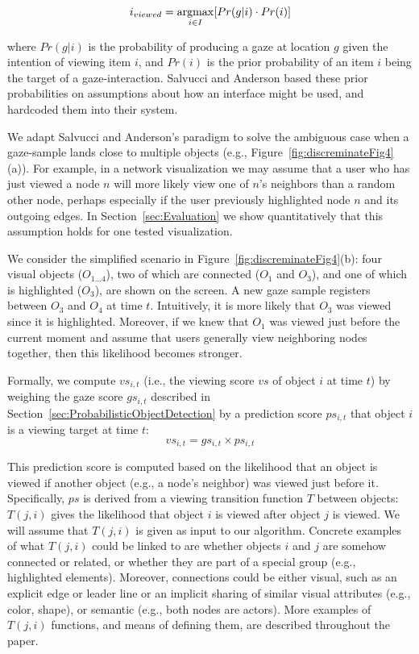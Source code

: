 \begin{equation*}
i_{viewed} = \displaystyle \operatorname*{argmax}_{i\in I}[Pr(g|i)\cdot Pr(i)]
\end{equation*}

where $Pr(g|i)$ is the probability of producing a gaze at location $g$ given the intention of viewing item $i$, and $Pr(i)$ is the prior probability of an item $i$  being the target of a gaze-interaction. Salvucci and Anderson based these prior probabilities on assumptions about how an interface might be used, and hardcoded them into their system.  

We adapt Salvucci and Anderson's paradigm to solve the ambiguous case when a gaze-sample lands close to multiple objects (e.g.,  Figure~\ref{fig:discreminateFig4}(a)). For example, in a network visualization we may assume that a user who has just viewed a node $n$ will more likely view one of $n$'s neighbors than a random other node, perhaps especially if the user previously highlighted node $n$ and its outgoing edges.  In Section~\ref{sec:Evaluation} we show quantitatively that this assumption holds for one tested visualization.  

We consider the simplified scenario in Figure~\ref{fig:discreminateFig4}(b): four visual objects ($O_{1\ldots 4}$), two of which are connected ($O_1$ and $O_3$), and one of which is highlighted ($O_3$), are shown on the screen. A new gaze sample registers between $O_3$ and $O_4$ at time $t$. Intuitively, it is more likely that $O_3$ was viewed since it is highlighted. Moreover, if we knew that $O_1$ was viewed just before the current moment  and assume that users generally view neighboring nodes together, then this likelihood becomes stronger.         
 
Formally, we compute $vs_{i,t}$  (i.e., the viewing score $vs$ of object $i$ at time $t$) by weighing the gaze score $gs_{i,t}$ described in Section~\ref{sec:ProbabilisticObjectDetection} by a prediction score $ps_{i,t}$ that object $i$ is a viewing target at time $t$:  
\begin{equation}
vs_{i,t} = gs_{i,t} \times ps_{i,t}
\label{eq:VS}
\end{equation}

This prediction score is computed based on the likelihood that an object is viewed if another object (e.g.,  a node's neighbor) was viewed just before it. Specifically, $ps$ is derived from a viewing transition function $T$ between objects:  $T(j,i)$ gives the likelihood that object $i$ is viewed after object $j$ is viewed. We will assume that $T(j,i)$ is given as input to our algorithm. Concrete examples of what $T(j,i)$ could be linked to are whether objects $i$ and $j$ are somehow connected or related, or whether they are part of a special group (e.g., highlighted elements). Moreover, connections could be either visual, such as an explicit edge or leader line or an implicit sharing of similar visual attributes (e.g., color, shape), or semantic (e.g., both nodes are actors). More examples of $T(j,i)$ functions, and means of defining them, are described throughout the paper.

